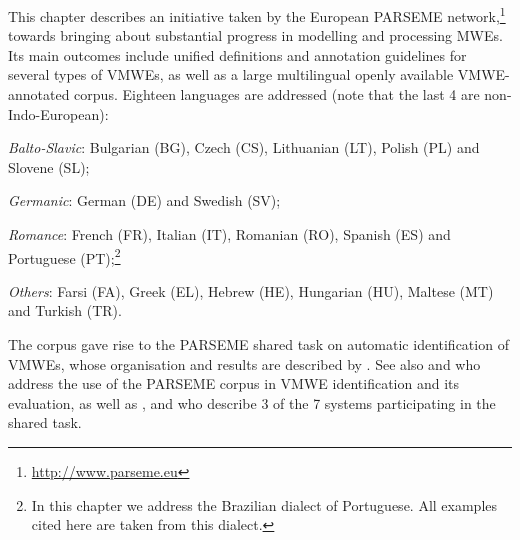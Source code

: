 \documentclass[output=paper,
modfonts,
]{langscibook}
\begin{document}
This chapter describes an initiative taken by the European PARSEME net\-work,\footnote{{\scriptsize  \url{http://www.parseme.eu}}} towards bringing about substantial progress in modelling and processing MWEs. Its main outcomes include unified definitions and annotation guidelines for several types of VMWEs, as well as a large multilingual openly available VMWE-annotated corpus. Eighteen languages are addressed (note that the last 4 are non-Indo-European): 
\begin{sitem}
\item\label{language-groups}
\textit{Balto-Slavic}: Bulgarian (BG), Czech (CS), Lithuanian (LT), Polish (PL) and Slovene (SL);
\item
\textit{Germanic}: German (DE) and Swedish (SV); 
\item
\textit{Romance}: French (FR), Italian (IT), Romanian (RO), Spanish (ES) and Portuguese (PT);\footnote{In this chapter we address the Brazilian dialect of Portuguese. All examples cited here are taken from this dialect.}
\item
\textit{Others}: Farsi (FA), Greek (EL), Hebrew (HE), Hungarian (HU), Maltese (MT) and Turkish (TR).
 \end{sitem}
The corpus gave rise to the PARSEME shared task on automatic identification of VMWEs, whose organisation and results are described by \citet{MWEWorkshop}. See also  and  who address the use of the PARSEME corpus in VMWE identification and its evaluation, as well as ,  and  who  describe 3 of the 7 systems participating in the shared task.
 
\end{document}
